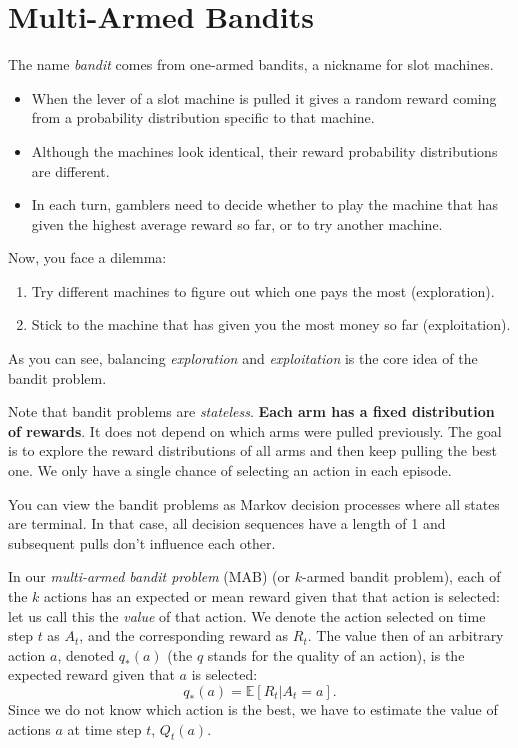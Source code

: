 \section{Multi-Armed Bandits}
The name \textit{bandit} comes from one-armed bandits, a nickname for slot machines.
\begin{itemize}
	\item When the lever of a slot machine is pulled it gives a random reward coming from a probability distribution specific to that machine.
	\item Although the machines look identical, their reward probability distributions are different. 
	\item In each turn, gamblers need to decide whether to play the machine that has given the highest average reward so far, or to try another machine. 
\end{itemize}
Now, you face a dilemma:
\begin{enumerate}
	\item Try different machines to figure out which one pays the most (exploration).
	\item Stick to the machine that has given you the most money so far (exploitation).
\end{enumerate}
As you can see, balancing \textit{exploration} and \textit{exploitation} is the core idea of the bandit problem.

Note that bandit problems are \textit{stateless}. \textbf{Each arm has a fixed distribution of rewards}. It does not depend on which arms were pulled previously. The goal is to explore the reward distributions of all arms and then keep pulling the best one. We only have a single chance of selecting an action in each episode. 

You can view the bandit problems as Markov decision processes where all states are terminal. In that case, all decision sequences have a length of 1 and subsequent pulls don't influence each other.

In our \textit{multi-armed bandit problem} (MAB) (or $k$-armed bandit problem), each of the $k$ actions has an expected or mean reward given that that action is selected: let us call this the \textit{value} of that action. We denote the action selected on time step $t$ as $A_t$, and the corresponding reward as $R_t$. The value then of an arbitrary action $a$, denoted $q_*(a)$ (\cf the $q$ stands for the quality of an action), is the expected reward given that $a$ is selected:
$$q_*(a) = \mathbb{E}[R_t|A_t=a].$$
Since we do not know which action is the best, we have to estimate the value of actions $a$ at time step $t$, $Q_t(a)$.

